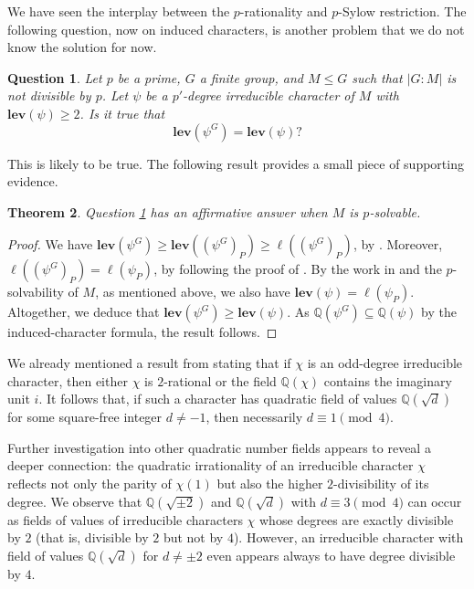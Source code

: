 \documentclass[12pt]{amsart}
\newtheorem{theorem}{Theorem}[section]
\newtheorem{question}[theorem]{Question}
\theoremstyle{definition}
\numberwithin{equation}{section}
\newcommand{\QQ}{{\mathbb Q}}
\newcommand{\lev}{\mathrm{\mathbf{lev}}}
\begin{document}
We have seen the interplay between the $p$-rationality and $p$-Sylow
restriction. The following question, now on induced characters, is
another problem that we do not know the solution for now.



\begin{question}\label{prob:lev-induced}
Let $p$ be a prime, $G$ a finite group, and $M\leq G$ such that
$|G:M|$ is not divisible by $p$. Let $\psi$ be a $p'$-degree
irreducible character of $M$ with $\lev(\psi)\geq 2$. Is it true
that
\[\lev(\psi^G)=\lev(\psi)?\]
\end{question}

This is likely to be true. The following result provides a small
piece of supporting evidence.


\begin{theorem}
Question \ref{prob:lev-induced} has an affirmative answer when $M$
is $p$-solvable.
\end{theorem}

\begin{proof}
We have $\lev(\psi^G)\geq\lev((\psi^G)_P)\geq \ell((\psi^G)_P)$, by
\cite[Lemma~4.2]{HS25}. Moreover, $\ell((\psi^G)_P)=\ell(\psi_P)$,
by following the proof of \cite[Lemma~4.3]{HS25}. By the work in
\cite{Isaacs-Navarro24} and the $p$-solvability of $M$, as mentioned
above, we also have $\lev(\psi)=\ell(\psi_P)$. Altogether, we deduce
that $\lev(\psi^G)\geq \lev(\psi)$. As $\QQ(\psi^G)\subseteq
\QQ(\psi)$ by the induced-character formula, the result follows.
\end{proof}


We already mentioned a result from \cite{ILNT} stating that if
$\chi$ is an odd-degree irreducible character, then either $\chi$ is
$2$-rational or the field $\mathbb{Q}(\chi)$ contains the imaginary
unit $i$. It follows that, if such a character has quadratic field
of values $\mathbb{Q}(\sqrt{d})$ for some square-free integer $d \ne
-1$, then necessarily $d \equiv 1 \pmod{4}$.

Further investigation into other quadratic number fields appears to
reveal a deeper connection: the quadratic irrationality of an
irreducible character $\chi$ reflects not only the parity of
$\chi(1)$ but also the higher $2$-divisibility of its degree. We
observe that $\mathbb{Q}(\sqrt{\pm 2})$ and $\mathbb{Q}(\sqrt{d})$
with $d \equiv 3 \pmod{4}$ can occur as fields of values of
irreducible characters $\chi$ whose degrees are exactly divisible by
$2$ (that is, divisible by $2$ but not by $4$). However, an
irreducible character with field of values $\mathbb{Q}(\sqrt{d})$
for $d \ne \pm 2$ even appears always to have degree divisible by
$4$.
\end{document}
